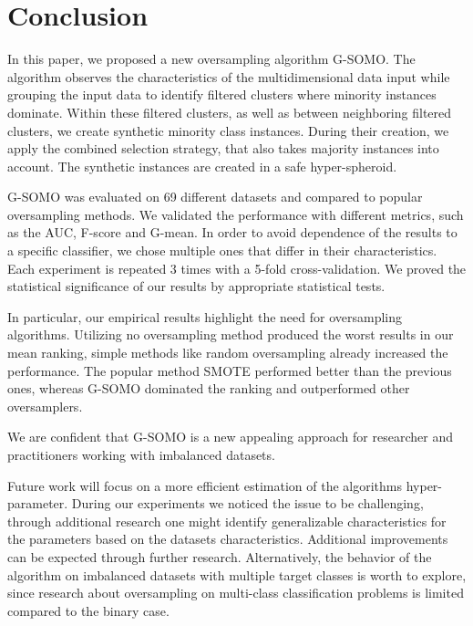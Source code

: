 \documentclass[parskip=full]{scrartcl}
\begin{document}
\section{Conclusion}

In this paper, we proposed a new oversampling algorithm G-SOMO. The algorithm
observes the characteristics of the multidimensional data input while grouping
the input data to identify filtered clusters where minority instances dominate.
Within these filtered clusters, as well as between neighboring filtered
clusters, we create synthetic minority class instances. During their creation,
we apply the combined selection strategy, that also takes majority instances
into account. The synthetic instances are created in a safe hyper-spheroid.

G-SOMO was evaluated on 69 different datasets and compared to popular
oversampling methods. We validated the performance with different metrics, such
as the AUC, F-score and G-mean. In order to avoid dependence of the results to a
specific classifier, we chose multiple ones that differ in their
characteristics. Each experiment is repeated 3 times with a 5-fold
cross-validation. We proved the statistical significance of our results by
appropriate statistical tests.

In particular, our empirical results highlight the need for oversampling
algorithms. Utilizing no oversampling method produced the worst results in our
mean ranking, simple methods like random oversampling already increased the
performance. The popular method SMOTE performed better than the previous ones,
whereas G-SOMO dominated the ranking and outperformed other oversamplers. 

We are confident that G-SOMO is a new appealing approach for researcher and
practitioners working with imbalanced datasets. 

Future work will focus on a more efficient estimation of the algorithms
hyper-parameter. During our experiments we noticed the issue to be challenging,
through additional research one might identify generalizable characteristics for
the parameters based on the datasets characteristics. Additional improvements
can be expected through further research. Alternatively, the behavior of the
algorithm on imbalanced datasets with multiple target classes is worth to
explore, since research about oversampling on multi-class classification
problems is limited compared to the binary case. 



\end{document}
